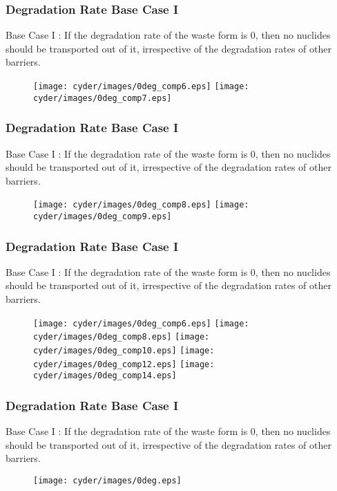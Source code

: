 \begin{frame}
  \frametitle{Degradation Rate Base Case I}
  Base Case I : If the degradation rate of the waste form is 0, then no nuclides should be 
  transported out of it, irrespective of the degradation rates of other 
  barriers. 

  \begin{figure}[htbp!]
    \begin{center}
      \texttt{[image: cyder/images/0deg\_comp6.eps]}
      \texttt{[image: cyder/images/0deg\_comp7.eps]}
    \end{center}
  \end{figure}
\end{frame}

\begin{frame}
  \frametitle{Degradation Rate Base Case I}
  Base Case I : If the degradation rate of the waste form is 0, then no nuclides should be 
  transported out of it, irrespective of the degradation rates of other 
  barriers. 

  \begin{figure}[htbp!]
    \begin{center}
      \texttt{[image: cyder/images/0deg\_comp8.eps]}
      \texttt{[image: cyder/images/0deg\_comp9.eps]}
    \end{center}
  \end{figure}
\end{frame}

\begin{frame}
  \frametitle{Degradation Rate Base Case I}
  Base Case I : If the degradation rate of the waste form is 0, then no nuclides should be 
  transported out of it, irrespective of the degradation rates of other 
  barriers. 

  \begin{figure}[htbp!]
    \begin{center}
      \texttt{[image: cyder/images/0deg\_comp6.eps]}
      \texttt{[image: cyder/images/0deg\_comp8.eps]}
      \texttt{[image: cyder/images/0deg\_comp10.eps]}
      \texttt{[image: cyder/images/0deg\_comp12.eps]}
      \texttt{[image: cyder/images/0deg\_comp14.eps]}
    \end{center}
  \end{figure}
\end{frame}

\begin{frame}
  \frametitle{Degradation Rate Base Case I}
  Base Case I : If the degradation rate of the waste form is 0, then no nuclides should be 
  transported out of it, irrespective of the degradation rates of other 
  barriers. 

  \begin{figure}[htbp!]
    \begin{center}
      \texttt{[image: cyder/images/0deg.eps]}
    \end{center}
  \end{figure}
\end{frame}



